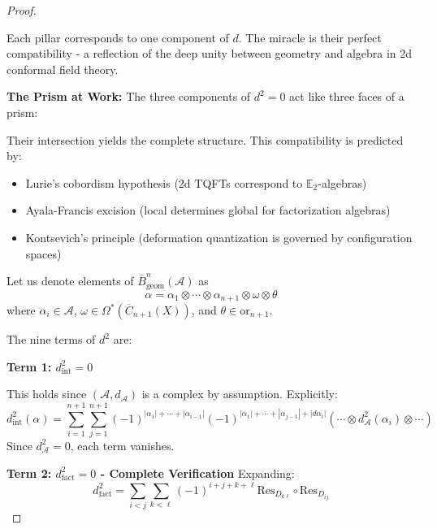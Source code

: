 \begin{proof}
\begin{remark}
Each pillar corresponds to one component of $d$. The miracle is their perfect compatibility - a 
reflection of the deep unity between geometry and algebra in 2d conformal field theory.

\textbf{The Prism at Work:} The three components of $d^2 = 0$ act like three faces of a prism:
\begin{center}
\end{center}

Their intersection yields the complete structure. This compatibility is predicted by:
\begin{itemize}
\item Lurie's cobordism hypothesis (2d TQFTs correspond to $\mathbb{E}_2$-algebras)
\item Ayala-Francis excision (local determines global for factorization algebras)
\item Kontsevich's principle (deformation quantization is governed by configuration spaces)
\end{itemize}
\end{remark}

Let us denote elements of $\bar{B}^n_{\text{geom}}(\mathcal{A})$ as 
$$\alpha = \alpha_1 \otimes \cdots \otimes \alpha_{n+1} \otimes \omega \otimes \theta$$
where $\alpha_i \in \mathcal{A}$, $\omega \in \Omega^*(\overline{C}_{n+1}(X))$, and $\theta \in \text{or}_{n+1}$.

The nine terms of $d^2$ are:

\textbf{Term 1: $d_{\text{int}}^2 = 0$}

This holds since $(\mathcal{A}, d_{\mathcal{A}})$ is a complex by assumption. Explicitly:
$$d_{\text{int}}^2(\alpha) = \sum_{i=1}^{n+1} \sum_{j=1}^{n+1} (-1)^{|\alpha_1|+\cdots+|\alpha_{i-1}|} (-1)^{|\alpha_1|+\cdots+|\alpha_{j-1}|+|d\alpha_i|} (\cdots \otimes d_{\mathcal{A}}^2(\alpha_i) \otimes \cdots)$$
Since $d_{\mathcal{A}}^2 = 0$, each term vanishes.

\textbf{Term 2: $d_{\text{fact}}^2 = 0$ - Complete Verification}
Expanding:
$$d_{\text{fact}}^2 = \sum_{i<j} \sum_{k<\ell} (-1)^{i+j+k+\ell} \text{Res}_{D_{k\ell}} \circ \text{Res}_{D_{ij}}$$


\end{proof}
